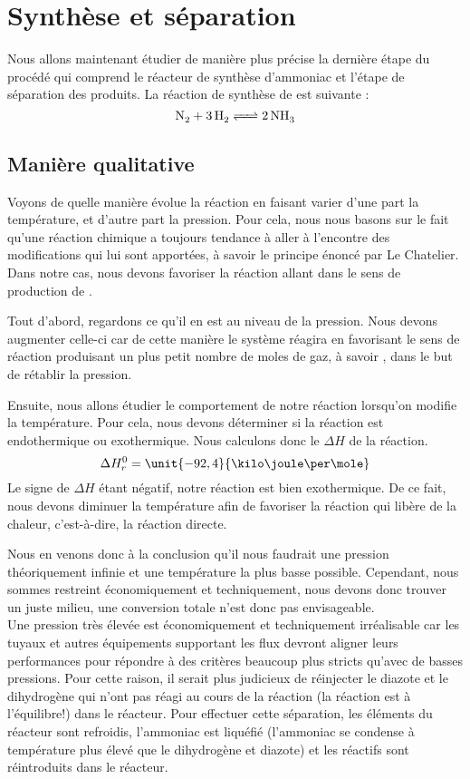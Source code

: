 \documentclass[10pt,a4paper]{article}
\begin{document}
\section{Synthèse  et séparation}

Nous allons maintenant étudier de manière plus précise la dernière étape du procédé qui comprend le réacteur de synthèse d’ammoniac et l'étape de séparation des produits.
La réaction de synthèse de  est suivante :
\[ \ce{N_2 + 3H2 <=> 2NH3} \]

\subsection{Manière qualitative}

Voyons de quelle manière évolue la réaction en faisant varier d'une part la température, et d'autre part la pression. Pour cela, nous nous basons sur le fait qu'une réaction chimique a toujours tendance à   aller à l'encontre des modifications qui lui sont apportées, à savoir le principe énoncé par Le Chatelier. Dans notre cas, nous devons favoriser la réaction allant dans le sens de production de .

Tout d'abord, regardons ce qu'il en est au niveau de la pression. Nous devons augmenter celle-ci car de cette manière le système réagira en favorisant le sens de réaction produisant un plus petit nombre de moles de gaz, à savoir , dans le but de rétablir la pression. 

Ensuite, nous allons étudier le comportement de notre réaction lorsqu'on modifie la température. Pour cela, nous devons déterminer si la réaction est endothermique ou exothermique. Nous calculons donc le $\Delta H$  de la réaction.
\[ \Delta H^0_r = \unit{-92,4}{\kilo\joule\per\mole} \]
Le signe de $\Delta H$ étant négatif, notre réaction est bien exothermique. De ce fait, nous devons diminuer la température afin de favoriser la réaction qui libère de la chaleur, c'est-à-dire, la réaction directe.

Nous en venons donc à la conclusion qu'il nous faudrait une pression théoriquement infinie et une température la plus basse possible. Cependant, nous sommes restreint économiquement et techniquement, nous devons donc trouver un juste milieu, une conversion totale n'est donc pas envisageable. 
\\

Une pression très élevée est économiquement et techniquement irréalisable car les tuyaux et autres équipements supportant les flux devront aligner leurs performances pour répondre à des critères beaucoup plus stricts qu'avec de basses pressions.
Pour cette raison, il serait plus judicieux de réinjecter  le diazote et le dihydrogène qui n'ont pas réagi au cours de la réaction (la réaction est à l'équilibre!) dans le réacteur. Pour effectuer cette séparation, les éléments du réacteur sont refroidis, l'ammoniac est liquéfié (l'ammoniac se condense à température plus élevé que le dihydrogène et diazote) et les réactifs sont réintroduits dans le réacteur.
\end{document}
